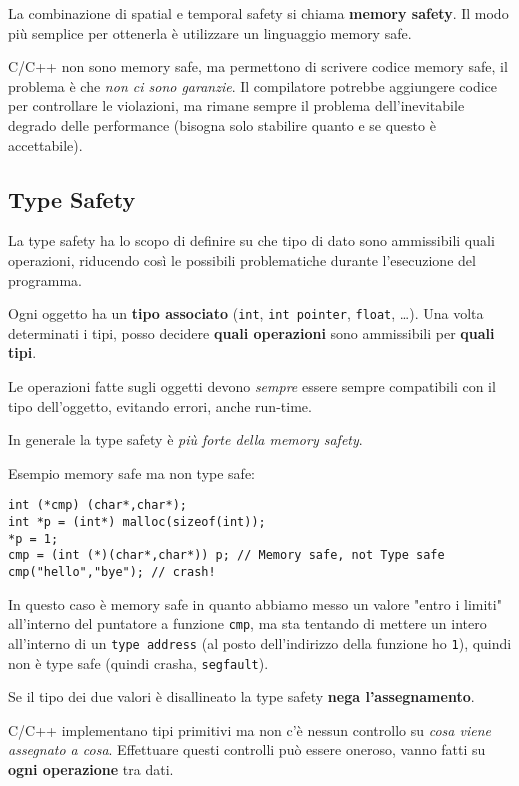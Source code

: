 La combinazione di spatial e temporal safety si chiama \textbf{memory safety}. Il modo più semplice per ottenerla è utilizzare un linguaggio memory safe. 

C/C++ non sono memory safe, ma permettono di scrivere codice memory safe, il problema è che \textit{non ci sono garanzie}. Il compilatore potrebbe aggiungere codice per controllare le violazioni, ma rimane sempre il problema dell'inevitabile degrado delle performance (bisogna solo stabilire quanto e se questo è accettabile).


\subsection{Type Safety}

La type safety ha lo scopo di definire su che tipo di dato sono ammissibili quali operazioni, riducendo così le possibili problematiche durante l'esecuzione del programma.

Ogni oggetto ha un \textbf{tipo associato} (\texttt{int}, \texttt{int pointer}, \texttt{float}, \dots). Una volta determinati i tipi, posso decidere \textbf{quali operazioni} sono ammissibili per \textbf{quali tipi}. 

Le operazioni fatte sugli oggetti devono \textit{sempre} essere sempre compatibili con il tipo dell'oggetto, evitando errori, anche run-time.

In generale la type safety è \textit{più forte della memory safety}. 

Esempio memory safe ma non type safe:
\begin{verbatim}
int (*cmp) (char*,char*);
int *p = (int*) malloc(sizeof(int));
*p = 1;
cmp = (int (*)(char*,char*)) p; // Memory safe, not Type safe
cmp("hello","bye"); // crash!
\end{verbatim}

In questo caso è memory safe in quanto abbiamo messo un valore "entro i limiti" all'interno del puntatore a funzione \texttt{cmp}, ma sta tentando di mettere un intero all'interno di un \texttt{type address} (al posto dell'indirizzo della funzione ho \texttt{1}), quindi non è type safe (quindi crasha, \texttt{segfault}). 

Se il tipo dei due valori è disallineato la type safety \textbf{nega l'assegnamento}.

C/C++ implementano tipi primitivi ma non c'è nessun controllo su \textit{cosa viene assegnato a cosa}. Effettuare questi controlli può essere oneroso, vanno fatti su \textbf{ogni operazione} tra dati. 

